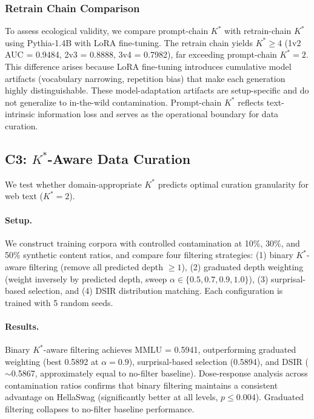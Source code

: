 \documentclass[11pt,a4paper]{article}
\begin{document}
\subsubsection{Retrain Chain Comparison}

To assess ecological validity, we compare prompt-chain $K^*$ with retrain-chain $K^*$ using Pythia-1.4B with LoRA fine-tuning. The retrain chain yields $K^* \geq 4$ (1v2 AUC = 0.9484, 2v3 = 0.8888, 3v4 = 0.7982), far exceeding prompt-chain $K^*=2$. This difference arises because LoRA fine-tuning introduces cumulative model artifacts (vocabulary narrowing, repetition bias) that make each generation highly distinguishable. These model-adaptation artifacts are setup-specific and do not generalize to in-the-wild contamination. Prompt-chain $K^*$ reflects text-intrinsic information loss and serves as the operational boundary for data curation.

\subsection{C3: $K^*$-Aware Data Curation}
\label{sec:curation}

We test whether domain-appropriate $K^*$ predicts optimal curation granularity for web text ($K^*=2$).

\paragraph{Setup.}
We construct training corpora with controlled contamination at 10\%, 30\%, and 50\% synthetic content ratios, and compare four filtering strategies: (1) binary $K^*$-aware filtering (remove all predicted depth $\geq 1$), (2) graduated depth weighting (weight inversely by predicted depth, sweep $\alpha \in \{0.5, 0.7, 0.9, 1.0\}$), (3) surprisal-based selection, and (4) DSIR distribution matching. Each configuration is trained with 5 random seeds.

\paragraph{Results.}
Binary $K^*$-aware filtering achieves MMLU = 0.5941, outperforming graduated weighting (best 0.5892 at $\alpha=0.9$), surprisal-based selection (0.5894), and DSIR ($\sim$0.5867, approximately equal to no-filter baseline). Dose-response analysis across contamination ratios confirms that binary filtering maintains a consistent advantage on HellaSwag (significantly better at all levels, $p \leq 0.004$). Graduated filtering collapses to no-filter baseline performance.
\end{document}
